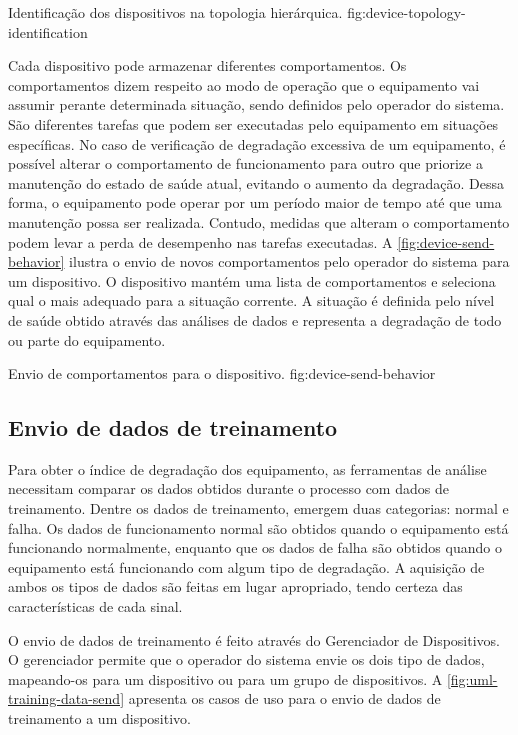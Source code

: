   {Identificação dos dispositivos na topologia hierárquica.}
  {fig:device-topology-identification}

Cada dispositivo pode armazenar diferentes comportamentos. Os comportamentos dizem respeito ao modo
de operação que o equipamento vai assumir perante determinada situação, sendo definidos pelo
operador do sistema. São diferentes tarefas que podem ser executadas pelo equipamento em situações
específicas. No caso de verificação de degradação excessiva de um equipamento, é possível alterar o
comportamento de funcionamento para outro que priorize a manutenção do estado de saúde atual,
evitando o aumento da degradação. Dessa forma, o equipamento pode operar por um período maior de
tempo até que uma manutenção possa ser realizada. Contudo, medidas que alteram o comportamento podem
levar a perda de desempenho nas tarefas executadas. A \cref{fig:device-send-behavior} ilustra o
envio de novos comportamentos pelo operador do sistema para um dispositivo. O dispositivo mantém uma
lista de comportamentos e seleciona qual o mais adequado para a situação corrente. A situação é
definida pelo nível de saúde obtido através das análises de dados e representa a degradação de todo
ou parte do equipamento.

  {Envio de comportamentos para o dispositivo.}
  {fig:device-send-behavior}


\subsection{Envio de dados de treinamento}

Para obter o índice de degradação dos equipamento, as ferramentas de análise necessitam comparar os
dados obtidos durante o processo com dados de treinamento. Dentre os dados de treinamento, emergem
duas categorias: normal e falha. Os dados de funcionamento normal são obtidos quando o equipamento
está funcionando normalmente, enquanto que os dados de falha são obtidos quando o equipamento está
funcionando com algum tipo de degradação. A aquisição de ambos os tipos de dados são feitas em lugar
apropriado, tendo certeza das características de cada sinal.

O envio de dados de treinamento é feito através do Gerenciador de Dispositivos. O gerenciador
permite que o operador do sistema envie os dois tipo de dados, mapeando-os para um dispositivo ou
para um grupo de dispositivos. A \cref{fig:uml-training-data-send} apresenta os casos de uso para o
envio de dados de treinamento a um dispositivo.

